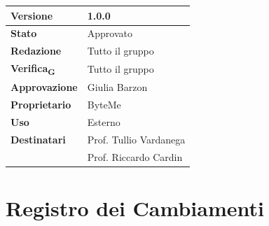 \documentclass[11pt,a4paper]{article}
\newcommand{\gls}[1]{#1\textsubscript{G}}
\begin{document}
\begin{titlepage}
    \begin{table}[H]
        \centering
        \begin{tabular}{|l|p{5cm}|}
            \hline
            \textbf{Versione} & 1.0.0 \\
            \hline
            \textbf{Stato} & Approvato \\
            \hline
            \textbf{Redazione} & Tutto il gruppo\\
            \hline
            \textbf{\gls{Verifica}} & Tutto il gruppo\\
            \hline
            \textbf{Approvazione} & Giulia Barzon\\
            \hline
            \textbf{Proprietario} & ByteMe \\
            \hline
            \textbf{Uso} & Esterno \\
            \hline
            \textbf{Destinatari} & Prof. Tullio Vardanega \\ & Prof. Riccardo Cardin \\
            \hline
        \end{tabular}
    \end{table}
    
    \vfill
\end{titlepage}

\thispagestyle{empty}
\section*{Registro dei Cambiamenti}
\end{document}
